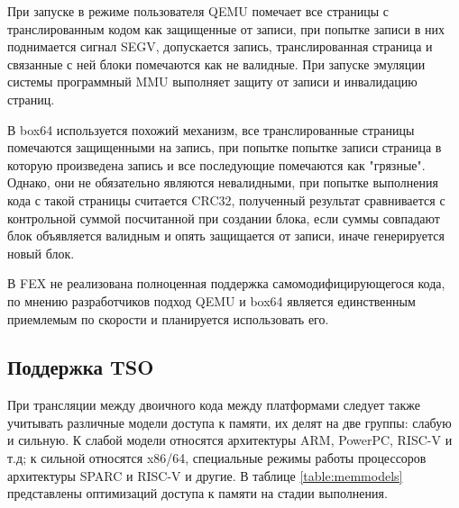 При запуске в режиме пользователя QEMU помечает все страницы с транслированным кодом как защищенные от записи, при попытке записи в них поднимается сигнал SEGV, допускается запись, транслированная страница и связанные с ней блоки помечаются как не валидные. При запуске эмуляции системы программный MMU выполняет защиту от записи и инвалидацию страниц. \cite{qemu_docs}

В box64 используется похожий механизм, все транслированные страницы помечаются защищенными на запись, при попытке попытке записи страница в которую произведена запись и все последующие помечаются как "грязные". Однако, они не обязательно являются невалидными, при попытке выполнения кода с такой страницы считается CRC32, полученный результат сравнивается с контрольной суммой посчитанной при создании блока, если суммы совпадают блок объявляется валидным и опять защищается от записи, иначе генерируется новый блок. \cite{box64_letter}

В FEX не реализована полноценная поддержка самомодифицирующегося кода, по мнению разработчиков подход QEMU и box64 является единственным приемлемым по скорости и планируется использовать его. \cite{FEX_letter}

\subsection{Поддержка TSO}

При трансляции между двоичного кода между платформами следует также учитывать различные модели доступа к памяти, их делят на две группы: слабую и сильную. К слабой модели относятся архитектуры ARM, PowerPC, RISC-V и т.д; к сильной относятся x86/64, специальные режимы работы процессоров архитектуры SPARC и RISC-V и другие. В таблице \ref{table:memmodels} представлены оптимизаций доступа к памяти на стадии выполнения.

\begin{table}[!htb]
	\begin{center}
		\label{table:memmodels}
		\caption{Таблица переупорядочиваний обращений к памяти \cite{memry}}
	\end{center}
\end{table}

